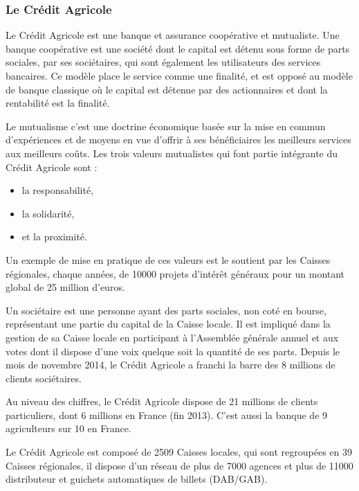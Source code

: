 \documentclass[12pt,a4paper]{article}
\begin{document}
\subsubsection{Le Crédit Agricole}
Le Crédit Agricole est une banque et assurance coopérative et mutualiste. Une banque coopérative est une société dont le capital est détenu sous forme de parts sociales, par ses sociétaires, qui sont également les utilisateurs des services bancaires. Ce modèle place le service comme une finalité, et est opposé au modèle de banque classique où le capital est détenue par des actionnaires et dont la rentabilité est la finalité.\par Le mutualisme c'est une doctrine économique basée sur la mise en commun d'expériences et de moyens en vue d'offrir à ses bénéficiaires les meilleurs services aux meilleurs coûts. Les trois valeurs mutualistes qui font partie intégrante du Crédit Agricole sont :
\begin{itemize}
\item la responsabilité,
\item la solidarité,
\item et la proximité.
\end{itemize}
Un exemple de mise en pratique de ces valeurs est le soutient par les Caisses régionales, chaque années, de 10000 projets d'intérêt généraux pour un montant global de 25 million d'euros. \par 
\medskip
Un sociétaire est une personne ayant des parts sociales, non coté en bourse, représentant une partie du capital de la Caisse locale. Il est impliqué dans la gestion de sa Caisse locale en participant à l'Assemblée générale annuel et aux votes dont il dispose d'une voix quelque soit la quantité de ses parts. Depuis le mois de novembre 2014, le Crédit Agricole a franchi la barre des 8 millions de clients sociétaires.\par
\medskip
Au niveau des chiffres, le Crédit Agricole dispose de 21 millions de clients particuliers, dont 6 millions en France (fin 2013). C'est aussi la banque de 9 agriculteurs sur 10 en France.\par 
Le Crédit Agricole est composé de 2509 Caisses locales, qui sont regroupées en 39 Caisses régionales, il dispose d'un réseau de plus de 7000 agences et plus de 11000 distributeur et guichets automatiques de billets (DAB/GAB).\par 
\end{document}

